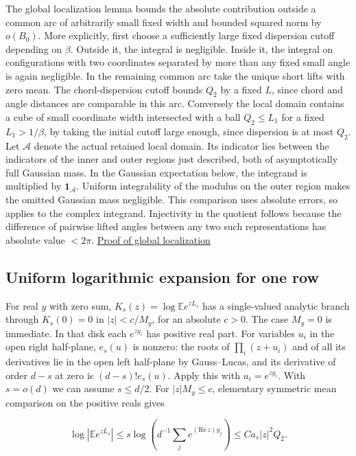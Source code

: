 The global localization lemma bounds the absolute contribution outside a common arc of arbitrarily small fixed width and bounded squared norm by $o(B_0)$. More explicitly, first choose a sufficiently large fixed dispersion cutoff depending on $\beta$. Outside it, the integral is negligible. Inside it, the integral on configurations with two coordinates separated by more than any fixed small angle is again negligible. In the remaining common arc take the unique short lifts with zero mean. The chord-dispersion cutoff bounds $Q_2$ by a fixed $L$, since chord and angle distances are comparable in this arc. Conversely the local domain contains a cube of small coordinate width intersected with a ball $Q_2\le L_1$ for a fixed $L_1>1/\beta$, by taking the initial cutoff large enough, since dispersion is at most $Q_2$. Let $\mathcal A$ denote the actual retained local domain. Its indicator lies between the indicators of the inner and outer regions just described, both of asymptotically full Gaussian mass. In the Gaussian expectation below, the integrand is multiplied by $\mathbf 1_{\mathcal A}$. Uniform integrability of the modulus on the outer region makes the omitted Gaussian mass negligible. This comparison uses absolute errors, so applies to the complex integrand. Injectivity in the quotient follows because the difference of pairwise lifted angles between any two such representations has absolute value $<2\pi$. \hyperref[sec:sparse-fixed-profile-global-localization]{Proof of global localization}

\subsection{Uniform logarithmic expansion for one row}

For real $y$ with zero sum, $K_s(z)=\log\mathbb E e^{zL_s}$ has a single-valued analytic branch through $K_s(0)=0$ in $|z|<c/M_y$, for an absolute $c>0$. The case $M_y=0$ is immediate. In that disk each $e^{zy_i}$ has positive real part. For variables $u_i$ in the open right half-plane, $e_s(u)$ is nonzero: the roots of $\prod_i(z+u_i)$ and of all its derivatives lie in the open left half-plane by Gauss--Lucas, and its derivative of order $d-s$ at zero is $(d-s)!e_s(u)$. Apply this with $u_i=e^{zy_i}$. With $s=o(d)$ we can assume $s\le d/2$. For $|z|M_y\le c$, elementary symmetric mean comparison on the positive reals gives

\begin{equation*}
\log|\mathbb Ee^{z L_s}|\le s\log\left(d^{-1}\sum_j e^{(\mathrm{Re}\,z)y_j}\right)
\le C a_s |z|^2 Q_2 .
\end{equation*}

